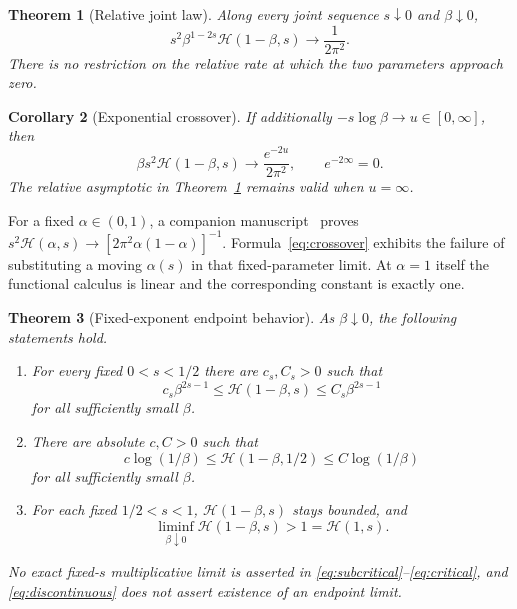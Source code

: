 \documentclass[11pt]{article}
\newtheorem{theorem}{Theorem}[section]
\newtheorem{corollary}[theorem]{Corollary}
\numberwithin{equation}{section}
\newcommand{\cH}{\mathcal H}
\begin{document}
\begin{theorem}[Relative joint law]\label{thm:joint}
Along every joint sequence $s\downarrow0$ and $\beta\downarrow0$,
\begin{equation}\label{eq:joint}
 s^2\beta^{1-2s}\cH(1-\beta,s)\longrightarrow\frac1{2\pi^2}.
\end{equation}
There is no restriction on the relative rate at which the two
parameters approach zero.
\end{theorem}

\begin{corollary}[Exponential crossover]\label{cor:crossover}
If additionally $-s\log\beta\to u\in[0,\infty]$, then
\begin{equation}\label{eq:crossover}
 \beta s^2\cH(1-\beta,s)\longrightarrow
                  \frac{e^{-2u}}{2\pi^2},
 \qquad e^{-2\infty}=0.
\end{equation}
The relative asymptotic in Theorem~\ref{thm:joint} remains valid when
$u=\infty$.
\end{corollary}

For a fixed $\alpha\in(0,1)$, a companion manuscript~\cite{Companion}
proves $s^2\cH(\alpha,s)\to[2\pi^2\alpha(1-\alpha)]^{-1}$.
Formula~\eqref{eq:crossover} exhibits the failure of substituting a
moving $\alpha(s)$ in that fixed-parameter limit. At $\alpha=1$
itself the functional calculus is linear and the corresponding
constant is exactly one.

\begin{theorem}[Fixed-exponent endpoint behavior]\label{thm:fixed}
As $\beta\downarrow0$, the following statements hold.
\begin{enumerate}
\item For every fixed $0<s<1/2$ there are $c_s,C_s>0$ such that
\begin{equation}\label{eq:subcritical}
 c_s\beta^{2s-1}\le\cH(1-\beta,s)\le C_s\beta^{2s-1}
\end{equation}
for all sufficiently small $\beta$.
\item There are absolute $c,C>0$ such that
\begin{equation}\label{eq:critical}
 c\log(1/\beta)\le\cH(1-\beta,1/2)\le C\log(1/\beta)
\end{equation}
for all sufficiently small $\beta$.
\item For each fixed $1/2<s<1$, $\cH(1-\beta,s)$ stays bounded, and
\begin{equation}\label{eq:discontinuous}
 \liminf_{\beta\downarrow0}\cH(1-\beta,s)>1=\cH(1,s).
\end{equation}
\end{enumerate}
No exact fixed-$s$ multiplicative limit is asserted in
\eqref{eq:subcritical}--\eqref{eq:critical}, and
\eqref{eq:discontinuous} does not assert existence of an endpoint limit.
\end{theorem}
\end{document}
